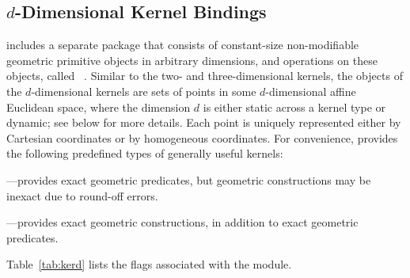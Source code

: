 \subsection{$d$-Dimensional Kernel Bindings}
\label{ssec:modules:kerneld}
\cgal{} includes a separate package that consists of constant-size
non-modifiable geometric primitive objects in arbitrary dimensions,
and operations on these objects, called
\dDGeometryKernelPackage{}~\cite{cgal:s-gkd-21a}. Similar to the two-
and three-dimensional kernels, the objects of the $d$-dimensional
kernels are sets of points in some $d$-dimensional affine Euclidean
space, where the dimension $d$ is either static across a kernel type
or dynamic; see below for more details. Each point is uniquely
represented either by Cartesian coordinates or by homogeneous
coordinates. For convenience, \cgal{} provides the following
predefined types of generally useful kernels:
\begin{compactenum}
\item {}---provides exact geometric
  predicates, but geometric constructions may be inexact due to
  round-off errors.
\item {}---provides exact geometric
  constructions, in addition to exact geometric predicates.
\end{compactenum}
Table~\ref{tab:kerd} lists the \cmake{} flags associated with the
\dDGeometryKernelPackage{} module.

\begin{table}[!htp]
  \caption{\dDGeometryKernelPackage{} module flags}
  \centering{}
 \label{tab:kerd}
\end{table}

